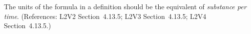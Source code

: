 The units of the  formula in a \KineticLaw definition should be
the equivalent of \emph{substance per time}.  (References: L2V2
Section~4.13.5; L2V3 Section~4.13.5; L2V4 Section~4.13.5.)
